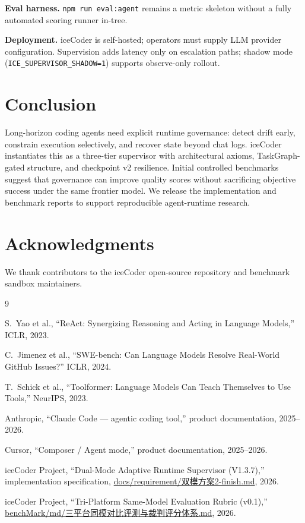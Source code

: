 \documentclass[11pt,a4paper]{article}
\begin{document}
\textbf{Eval harness.}
\texttt{npm run eval:agent} remains a metric skeleton without a fully automated scoring runner in-tree.

\textbf{Deployment.}
iceCoder is self-hosted; operators must supply LLM provider configuration.
Supervision adds latency only on escalation paths; shadow mode (\texttt{ICE\_SUPERVISOR\_SHADOW=1}) supports observe-only rollout.

\section{Conclusion}
\label{sec:conclusion}

Long-horizon coding agents need explicit runtime governance: detect drift early, constrain execution selectively, and recover state beyond chat logs.
iceCoder instantiates this as a three-tier supervisor with architectural axioms, TaskGraph-gated structure, and checkpoint v2 resilience.
Initial controlled benchmarks suggest that governance can improve quality scores without sacrificing objective success under the same frontier model.
We release the implementation and benchmark reports to support reproducible agent-runtime research.

\section*{Acknowledgments}
We thank contributors to the iceCoder open-source repository and benchmark sandbox maintainers.

\begin{thebibliography}{9}

S.~Yao et al.,
``ReAct: Synergizing Reasoning and Acting in Language Models,''
ICLR, 2023.

C.~Jimenez et al.,
``SWE-bench: Can Language Models Resolve Real-World GitHub Issues?''
ICLR, 2024.

T.~Schick et al.,
``Toolformer: Language Models Can Teach Themselves to Use Tools,''
NeurIPS, 2023.

Anthropic,
``Claude Code --- agentic coding tool,''
product documentation, 2025--2026.

Cursor,
``Composer / Agent mode,''
product documentation, 2025--2026.

iceCoder Project,
``Dual-Mode Adaptive Runtime Supervisor (V1.3.7),''
implementation specification,
\url{docs/requirement/双模方案2-finish.md}, 2026.

iceCoder Project,
``Tri-Platform Same-Model Evaluation Rubric (v0.1),''
\url{benchMark/md/三平台同模对比评测与裁判评分体系.md}, 2026.

\end{thebibliography}
\end{document}
